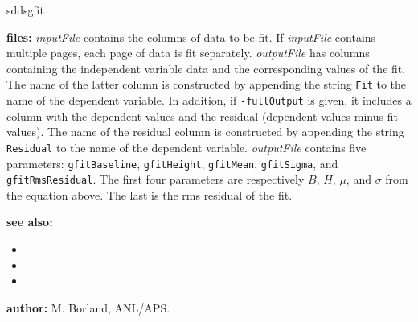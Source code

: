\begin{sddsprog}{sddsgfit}
  \item \textbf{files:}
  \emph{inputFile} contains the columns of data to be fit. If \emph{inputFile} contains multiple pages, each page of
  data is fit separately. \emph{outputFile} has columns containing the independent variable data and the corresponding
  values of the fit. The name of the latter column is constructed by appending the string \verb|Fit| to the name of the
  dependent variable. In addition, if \verb|-fullOutput| is given, it includes a column with the dependent values and
  the residual (dependent values minus fit values). The name of the residual column is constructed by appending the
  string \verb|Residual| to the name of the dependent variable. \emph{outputFile} contains five parameters:
  \verb|gfitBaseline|, \verb|gfitHeight|, \verb|gfitMean|, \verb|gfitSigma|, and \verb|gfitRmsResidual|. The first four
  parameters are respectively $B$, $H$, $\mu$, and $\sigma$ from the equation above. The last is the rms residual of the
  fit.

  \item \textbf{see also:}
  \begin{itemize}
    \item {}
    \item {}
    \item {}
  \end{itemize}

  \item \textbf{author:} M. Borland, ANL/APS.
\end{sddsprog}

